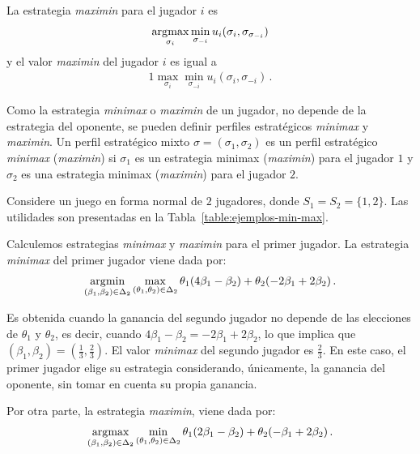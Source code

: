 \begin{definition}
La estrategia \textit{maximin} para el jugador $i$ es 
\begin{alignat}{1}
\operatorname*{\arg\!\max}_{\sigma_i}{\min_{\sigma_{-i}}{u_i(\sigma_i, \sigma_{\sigma_{-i}})}}
\end{alignat}
y el valor \textit{maximin} del jugador $i$ es igual a
\begin{alignat}{1}
\max_{\sigma_i}{\min_{\sigma_{-i}}{u_i(\sigma_i, \sigma_{-i})}} \,.
\end{alignat}
\end{definition}

Como la estrategia \textit{minimax} o \textit{maximin} de un jugador, no depende de la estrategia del oponente, se pueden definir perfiles estratégicos \textit{minimax} y \textit{maximin}. Un perfil estratégico mixto $\sigma = (\sigma_1, \sigma_2)$ es un perfil estratégico \textit{minimax} (\textit{maximin}) si $\sigma_1$ es un estrategia minimax (\textit{maximin}) para el jugador $1$ y $\sigma_2$ es una estrategia minimax (\textit{maximin}) para el jugador $2$.

\begin{example}
\label{ex:ejemplos-min-max}
Considere un juego en forma normal de $2$ jugadores, donde $S_1 = S_2 = \{1, 2\}$. Las utilidades son presentadas en la Tabla~\ref{table:ejemplos-min-max}.
\end{example}

Calculemos estrategias \textit{minimax} y \textit{maximin} para el primer jugador. La estrategia \textit{minimax} del primer jugador viene dada por:
\begin{alignat}{1}
\operatorname*{\arg\!\min}_{(\beta_1, \beta_2) \in \Delta_2 }{\max_{(\theta_1, \theta_2) \in \Delta_2}
{\theta_1(4\beta_1 -\beta_2) + \theta_2(-2\beta_1 + 2\beta_2)}} \,.
\end{alignat}

Es obtenida cuando la ganancia del segundo jugador no depende de las elecciones de $\theta_1$ y $\theta_2$, es decir, cuando $4\beta_1 - \beta_2 = -2\beta_1 + 2\beta_2$, lo que implica que $(\beta_1, \beta_2) = \left(\frac{1}{3}, \frac{2}{3} \right)$. El valor \textit{minimax} del segundo jugador es $\frac{2}{3}$. En este caso, el primer jugador elige su estrategia considerando, únicamente, la ganancia del oponente, sin tomar en cuenta su propia ganancia.

Por otra parte, la estrategia \textit{maximin}, viene dada por:
\begin{alignat}{1}
\operatorname*{\arg\!\max}_{(\beta_1, \beta_2) \in \Delta_2 }{\min_{(\theta_1, \theta_2) \in \Delta_2}
{\theta_1(2\beta_1 -\beta_2) + \theta_2(-\beta_1 + 2\beta_2)}} \,.
\end{alignat}

